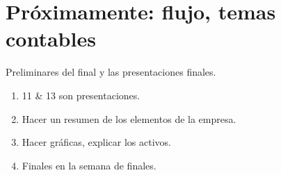 \section{Próximamente: flujo, temas contables}
Preliminares del final y las presentaciones finales.
\begin{enumerate}
    \item 11 \& 13 son presentaciones.
    \item Hacer un resumen de los elementos de la empresa.
    \item Hacer gráficas, explicar los activos.
    \item Finales en la semana de finales.
\end{enumerate}
